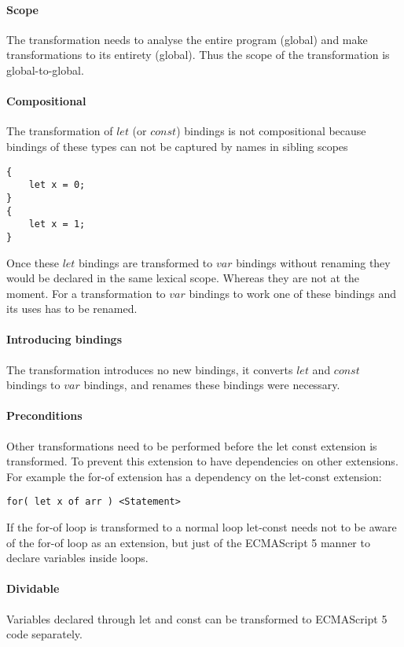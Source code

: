 \paragraph{Scope}
The transformation needs to analyse the entire program (global) and make transformations to its entirety (global). Thus the scope of the transformation is global-to-global.

\paragraph{Compositional}
The transformation of $let$ (or $const$) bindings is not compositional because bindings of these types can not be captured by names in sibling scopes

\begin{lstlisting}
{
	let x = 0;
}
{
	let x = 1;
}
\end{lstlisting} 

Once these $let$ bindings are transformed to $var$ bindings without renaming they would be declared in the same lexical scope. Whereas they are not at the moment. For a transformation to $var$ bindings to work one of these bindings and its uses has to be renamed.

\paragraph{Introducing bindings}
The transformation introduces no new bindings, it converts $let$ and $const$ bindings to $var$ bindings, and renames these bindings were necessary.

\paragraph{Preconditions}
Other transformations need to be performed before the let const extension is transformed. To prevent this extension to have dependencies on other extensions. For example the for-of extension has a dependency on the let-const extension:

\begin{lstlisting}
for( let x of arr ) <Statement>
\end{lstlisting}

If the for-of loop is transformed to a normal loop let-const needs not to be aware of the for-of loop as an extension, but just of the ECMAScript 5 manner to declare variables inside loops.

\paragraph{Dividable}
Variables declared through let and const can be transformed to ECMAScript 5 code separately.

